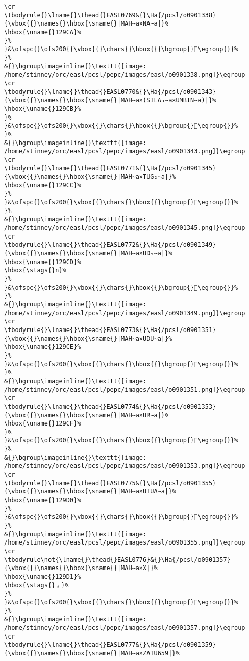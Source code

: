 \begin{verbatim}
\cr
\tbodyrule{}\lname{}\thead{}EASL0769&{}\Ha{/pcsl/o0901338}{\vbox{{}\names{}\hbox{\sname{}|MAH∼a×NA∼a|}%
\hbox{\uname{}129CA}%
}%
}&\ofspc{}\ofs200{}\vbox{{}\chars{}\hbox{{}\bgroup{}𒧊\egroup{}}%
}%
&{}\bgroup\imageinline{}\texttt{[image: /home/stinney/orc/easl/pcsl/pepc/images/easl/o0901338.png]}\egroup
\cr
\tbodyrule{}\lname{}\thead{}EASL0770&{}\Ha{/pcsl/o0901343}{\vbox{{}\names{}\hbox{\sname{}|MAH∼a×(SILA₃∼a×UMBIN∼a)|}%
\hbox{\uname{}129CB}%
}%
}&\ofspc{}\ofs200{}\vbox{{}\chars{}\hbox{{}\bgroup{}𒧋\egroup{}}%
}%
&{}\bgroup\imageinline{}\texttt{[image: /home/stinney/orc/easl/pcsl/pepc/images/easl/o0901343.png]}\egroup
\cr
\tbodyrule{}\lname{}\thead{}EASL0771&{}\Ha{/pcsl/o0901345}{\vbox{{}\names{}\hbox{\sname{}|MAH∼a×TUG₂∼a|}%
\hbox{\uname{}129CC}%
}%
}&\ofspc{}\ofs200{}\vbox{{}\chars{}\hbox{{}\bgroup{}𒧌\egroup{}}%
}%
&{}\bgroup\imageinline{}\texttt{[image: /home/stinney/orc/easl/pcsl/pepc/images/easl/o0901345.png]}\egroup
\cr
\tbodyrule{}\lname{}\thead{}EASL0772&{}\Ha{/pcsl/o0901349}{\vbox{{}\names{}\hbox{\sname{}|MAH∼a×UD₅∼a|}%
\hbox{\uname{}129CD}%
\hbox{\stags{}n}%
}%
}&\ofspc{}\ofs200{}\vbox{{}\chars{}\hbox{{}\bgroup{}𒧍\egroup{}}%
}%
&{}\bgroup\imageinline{}\texttt{[image: /home/stinney/orc/easl/pcsl/pepc/images/easl/o0901349.png]}\egroup
\cr
\tbodyrule{}\lname{}\thead{}EASL0773&{}\Ha{/pcsl/o0901351}{\vbox{{}\names{}\hbox{\sname{}|MAH∼a×UDU∼a|}%
\hbox{\uname{}129CE}%
}%
}&\ofspc{}\ofs200{}\vbox{{}\chars{}\hbox{{}\bgroup{}𒧎\egroup{}}%
}%
&{}\bgroup\imageinline{}\texttt{[image: /home/stinney/orc/easl/pcsl/pepc/images/easl/o0901351.png]}\egroup
\cr
\tbodyrule{}\lname{}\thead{}EASL0774&{}\Ha{/pcsl/o0901353}{\vbox{{}\names{}\hbox{\sname{}|MAH∼a×UR∼a|}%
\hbox{\uname{}129CF}%
}%
}&\ofspc{}\ofs200{}\vbox{{}\chars{}\hbox{{}\bgroup{}𒧏\egroup{}}%
}%
&{}\bgroup\imageinline{}\texttt{[image: /home/stinney/orc/easl/pcsl/pepc/images/easl/o0901353.png]}\egroup
\cr
\tbodyrule{}\lname{}\thead{}EASL0775&{}\Ha{/pcsl/o0901355}{\vbox{{}\names{}\hbox{\sname{}|MAH∼a×UTUA∼a|}%
\hbox{\uname{}129D0}%
}%
}&\ofspc{}\ofs200{}\vbox{{}\chars{}\hbox{{}\bgroup{}𒧐\egroup{}}%
}%
&{}\bgroup\imageinline{}\texttt{[image: /home/stinney/orc/easl/pcsl/pepc/images/easl/o0901355.png]}\egroup
\cr
\tbodyrule\not{\lname{}\thead{}EASL0776}&{}\Ha{/pcsl/o0901357}{\vbox{{}\names{}\hbox{\sname{}|MAH∼a×X|}%
\hbox{\uname{}129D1}%
\hbox{\stags{}﹟}%
}%
}&\ofspc{}\ofs200{}\vbox{{}\chars{}\hbox{{}\bgroup{}𒧑\egroup{}}%
}%
&{}\bgroup\imageinline{}\texttt{[image: /home/stinney/orc/easl/pcsl/pepc/images/easl/o0901357.png]}\egroup
\cr
\tbodyrule{}\lname{}\thead{}EASL0777&{}\Ha{/pcsl/o0901359}{\vbox{{}\names{}\hbox{\sname{}|MAH∼a×ZATU659|}%

\end{verbatim}
